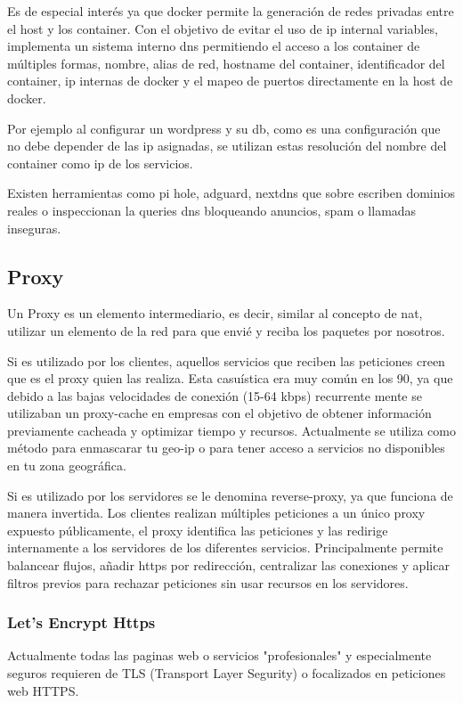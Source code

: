 Es de especial interés ya que docker permite la generación de redes privadas entre el host y los container. Con el objetivo de evitar el uso de ip internal variables, implementa un sistema interno dns permitiendo el acceso a los container de múltiples formas, nombre, alias de red, hostname del container, identificador del container, ip internas de docker y el mapeo de puertos directamente en la host de docker.

Por ejemplo al configurar un wordpress y su db, como es una configuración que no debe depender de las ip asignadas, se utilizan estas resolución del nombre del container como ip de los servicios.

Existen herramientas como pi hole\cite{c_pi_hole}, adguard, nextdns que sobre escriben dominios reales o inspeccionan la queries dns bloqueando anuncios, spam o llamadas inseguras.

\subsection{Proxy}\label{S:proxy_reverse}
Un Proxy es un elemento intermediario, es decir, similar al concepto de nat, utilizar un elemento de la red para que envié y reciba los paquetes por nosotros.

Si es utilizado por los clientes, aquellos servicios que reciben las peticiones creen que es el proxy quien las realiza. Esta casuística era muy común en los 90, ya que debido a las bajas velocidades de conexión (15-64 kbps) recurrente mente se utilizaban un proxy-cache en empresas con el objetivo de obtener información previamente cacheada y optimizar tiempo y recursos. Actualmente se utiliza como método para enmascarar tu geo-ip o para tener acceso a servicios no disponibles en tu zona geográfica.

Si es utilizado por los servidores se le denomina reverse-proxy, ya que funciona de manera invertida. Los clientes realizan múltiples peticiones a un único proxy expuesto públicamente, el proxy identifica las peticiones y las redirige internamente a los servidores de los diferentes servicios. Principalmente permite balancear flujos, añadir https por redirección, centralizar las conexiones y aplicar filtros previos para rechazar peticiones sin usar recursos en los servidores.

\subsubsection{Let's Encrypt Https}
Actualmente todas las paginas web o servicios "profesionales" y especialmente seguros requieren de TLS (Transport Layer Segurity) o focalizados en peticiones web HTTPS\cite{c_https}.

